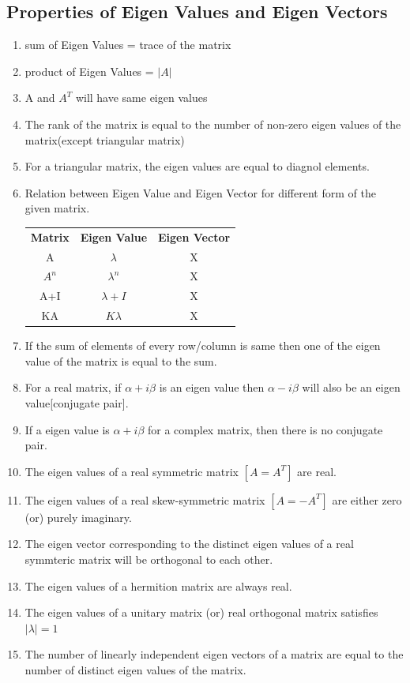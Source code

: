 \subsection*{Properties of Eigen Values and Eigen Vectors}
\begin{enumerate}
    \item sum of Eigen Values = trace of the matrix
    \item product of Eigen Values = \(|A|\)
    \item A and \(A^T\) will have same eigen values
    \item The rank of the matrix is equal to the number of non-zero eigen values of the matrix(except triangular matrix)
    \item For a triangular matrix, the eigen values are equal to diagnol elements.
    \item Relation between Eigen Value and Eigen Vector for different form of the given matrix.
    \begin{table}[h!]
    \centering
    \setlength{\tabcolsep}{1em}
    \begin{tabu}{ccc}
    \textbf{Matrix} & \textbf{Eigen Value}               & \textbf{Eigen Vector} \\
    A               & \(\lambda\)                        & X                     \\
    \(A^n\)         & \(\lambda^n\)                      & X                     \\
    A+I             & \(\lambda+I\)                      & X                     \\
    KA              & \(K\lambda\)                       & X                    
    \end{tabu}
    \end{table}
    \item If the sum of elements of every row/column is same then one of the eigen value of the matrix is equal to the sum.
    \item For a real matrix, if \(\alpha+i\beta\) is an eigen value then \(\alpha-i\beta\) will also be an eigen value[conjugate pair].
    \item If a eigen value is \(\alpha+i\beta\) for a complex matrix, then there is no conjugate pair.
    \item The eigen values of a real symmetric matrix \([A=A^T]\) are real.
    \item The eigen values of a real skew-symmetric matrix \([A=-A^T]\) are either zero (or) purely imaginary.
    \item The eigen vector corresponding to the distinct eigen values of a real symmteric matrix will be orthogonal to each other.
    \item The eigen values of a hermition matrix are always real.
    \item The eigen values of a unitary matrix (or) real orthogonal matrix satisfies \(|\lambda|=1\)
    \item The number of linearly independent eigen vectors of a matrix are equal to the number of distinct eigen values of the matrix.
\end{enumerate}


